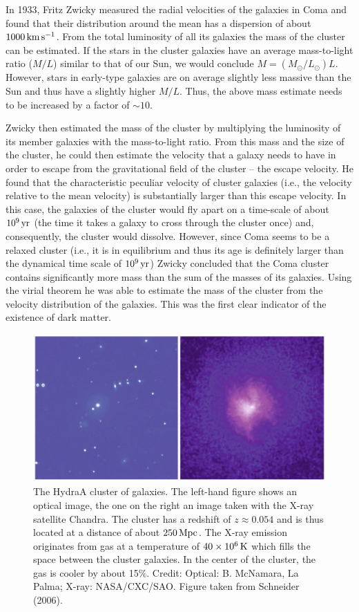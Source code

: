 \documentclass[a4paper,11pt]{article}
\begin{document}
{\noindent}In 1933, Fritz Zwicky measured the radial velocities of the galaxies in Coma and found that their distribution around the mean has a dispersion of about $1000\,{\rm km\,s^{-1}}$. From the total luminosity of all its galaxies the mass of the cluster can be estimated. If the stars in the cluster galaxies have an average mass-to-light ratio ($M/L$) similar to that of our Sun, we would conclude $M=(M_\odot/L_\odot)L$. However, stars in early-type galaxies are on average slightly less massive than the Sun and thus have a slightly higher $M/L$. Thus, the above mass estimate needs to be increased by a factor of $\sim10$.

{\noindent}Zwicky then estimated the mass of the cluster by multiplying the luminosity of its member galaxies with the mass-to-light ratio. From this mass and the size of the cluster, he could then estimate the velocity that a galaxy needs to have in order to escape from the gravitational field of the cluster -- the escape velocity. He found that the characteristic peculiar velocity of cluster galaxies (i.e., the velocity relative to the mean velocity) is substantially larger than this escape velocity. In this case, the galaxies of the cluster would fly apart on a time-scale of about $10^9\,{\rm yr}$ (the time it takes a galaxy to cross through the cluster once) and, consequently, the cluster would dissolve. However, since Coma seems to be a relaxed cluster (i.e., it is in equilibrium and thus its age is definitely larger than the dynamical time scale of $10^9\,{\rm yr}$) Zwicky concluded that the Coma cluster contains significantly more mass than the sum of the masses of its galaxies. Using the virial theorem he was able to estimate the mass of the cluster from the velocity distribution of the galaxies. This was the first clear indicator of the existence of dark matter.

\begin{figure}[h]
    \centering
    \includegraphics[width=14cm]{figures/HydraA.png}
    \caption{\footnotesize{The HydraA cluster of galaxies. The left-hand figure shows an optical image, the one on the right an image taken with the X-ray satellite Chandra. The cluster has a redshift of $z\approx0.054$ and is thus located at a distance of about $250\,{\rm Mpc}$. The X-ray emission originates from gas at a temperature of $40\times10^6\,{\rm K}$ which fills the space between the cluster galaxies. In the center of the cluster, the gas is cooler by about 15\%. Credit: Optical: B. McNamara, La Palma; X-ray: NASA/CXC/SAO. Figure taken from Schneider (2006).}}
    \label{fig:hydraa}
\end{figure}
\end{document}
